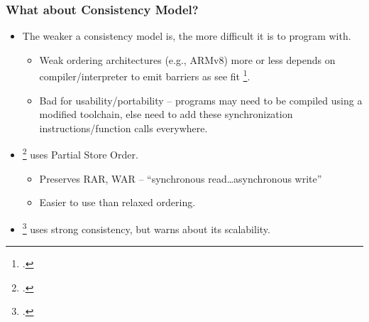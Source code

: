 \documentclass{beamer}
\begin{document}
\begin{frame}
    \frametitle{What about Consistency \textbf{Model}?}
    \begin{itemize}
        \item {
            The weaker a consistency model is, the more difficult it is to program with.
            \begin{itemize}
                \item {
                    Weak ordering architectures (e.g., ARMv8) more or less depends on
                    compiler/interpreter to emit barriers as see fit \footcite{Haynes_2022}.
                }
                \item {
                    Bad for usability/portability -- programs may need
                    to be compiled using a modified toolchain, else need to add these
                    synchronization instructions/function calls everywhere.
                }
            \end{itemize}
        }
        \item {
            \footcite{cai2018efficient} uses Partial Store Order.
            \begin{itemize}
                \item Preserves RAR, WAR -- ``synchronous read\dots asynchronous write''
                \item Easier to use than relaxed ordering.
            \end{itemize}
        }
        \item {
            \footcite{wang2021concordia} uses strong consistency, but warns about its scalability.
        }
    \end{itemize}
\end{frame}
\end{document}
